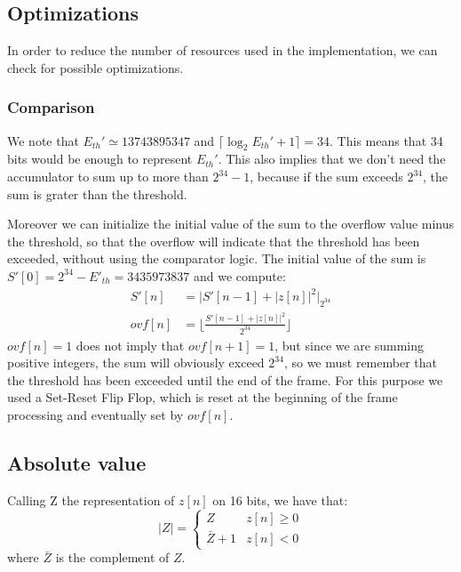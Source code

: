\subsection{Optimizations}
\label{sec:optimizations}

In order to reduce the number of resources used in the implementation, we can
check for possible optimizations.

\subsubsection{Comparison}
We note that $E_{th}' \simeq 13743895347$ and $\lceil\log_2 E_{th}' + 1\rceil = 34$.
This means that 34 bits would be enough to represent $E_{th}'$. This also implies
that we don't need the accumulator to sum up to more than $2^{34} - 1$, because
if the sum exceeds $2^{34}$, the sum is grater than the threshold.

Moreover we can initialize the initial value of the sum to the overflow value
minus the threshold, so that the overflow will indicate that the threshold has
been exceeded, without using the comparator logic. The initial value of the sum
is $S'[0] = 2^{34} - E'_{th} = 3435973837$ and we compute:
\begin{align*}
  S'[n] &= \bigg| S'[n-1] + |z[n]|^2 \bigg|_{2^{34}}\\
  ovf[n] &= \bigg\lfloor \frac{S'[n-1] + |z[n]|^2}{2^{34}} \bigg\rfloor
\end{align*}
$ovf[n] = 1$ does not imply that $ovf[n + 1] = 1$, but since we are summing
positive integers, the sum will obviously exceed $2^{34}$, so we must remember
that the threshold has been exceeded until the end of the frame.
For this purpose we used a Set-Reset Flip Flop, which is reset at the beginning
of the frame processing and eventually set by $ovf[n]$.

\subsection{Absolute value}
\label{sec:opt-abs}

Calling Z the representation of $z[n]$ on 16 bits, we have that:
\begin{equation}
  |Z| = \begin{cases}
    Z & z[n] \ge 0 \\
    \bar{Z}+1 & z[n] < 0
  \end{cases}
\end{equation}
where $\bar{Z}$ is the complement of $Z$.

